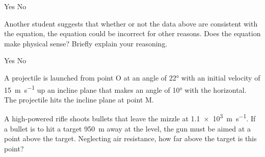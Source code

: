 \documentclass{../../../oss-ap12ibhl-print}
\begin{document}
\begin{questions}
\begin{parts}
\begin{subparts}
      \vspace{.1in}
      \underline{\hspace{.25in}} Yes\hspace{.5in}
      \underline{\hspace{.25in}} No

      \vspace{.1in}

      \subpart Another student suggests that whether or not the data above are
      consistent with the equation, the equation could be incorrect for other
      reasons. Does the equation make physical sense? Briefly explain your
      reasoning.

      \vspace{.1in}
      \underline{\hspace{.25in}} Yes\hspace{.5in}
      \underline{\hspace{.25in}} No
    
      \vspace{.1in}
    \end{subparts}
  \end{parts}
  \newpage
  
  
  \question A projectile is launched from point O at an angle of \ang{22} with
  an initial velocity of \SI{15}{\metre\per\second} up an incline plane that
  makes an angle of \ang{10} with the horizontal. The projectile hits the
  incline plane at point M.
  \newpage
  
  \question A high-powered rifle shoots bullets that leave the mizzle at
  \SI{1.1e3}{\metre\per\second}. If a bullet is to hit a target
  \SI{950}{\metre} away at the level, the gun must be aimed at a point above
  the target. Neglecting air resistance, how far above the target is this
  point?
  

\end{questions}
\end{document}
